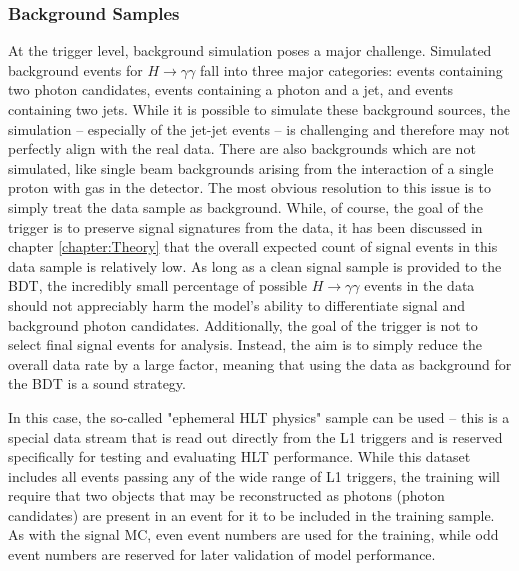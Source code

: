 \documentclass[12pt]{ucsddissertation}
\begin{document}
\subsubsection{Background Samples}\label{sec:HLTDataSamples}
At the trigger level, background simulation poses a major challenge. Simulated background events for $H \rightarrow \gamma\gamma$ fall into three major categories: events containing two photon candidates, events containing a photon and a jet, and events containing two jets. While it is possible to simulate these background sources, the simulation -- especially of the jet-jet events -- is challenging and therefore may not perfectly align with the real data. There are also backgrounds which are not simulated, like single beam backgrounds arising from the interaction of a single proton with gas in the detector. The most obvious resolution to this issue is to simply treat the data sample as background. While, of course, the goal of the trigger is to preserve signal signatures from the data, it has been discussed in chapter \ref{chapter:Theory} that the overall expected count of signal events in this data sample is relatively low. As long as a clean signal sample is provided to the BDT, the incredibly small percentage of possible $H \rightarrow \gamma\gamma$ events in the data should not appreciably harm the model's ability to differentiate signal and background photon candidates. Additionally, the goal of the trigger is not to select final signal events for analysis. Instead, the aim is to simply reduce the overall data rate by a large factor, meaning that using the data as background for the BDT is a sound strategy. 

In this case, the so-called "ephemeral HLT physics" sample can be used -- this is a special data stream that is read out directly from the L1 triggers and is reserved specifically for testing and evaluating HLT performance. While this dataset includes all events passing any of the wide range of L1 triggers, the training will require that two objects that may be reconstructed as photons (photon candidates) are present in an event for it to be included in the training sample. As with the signal MC, even event numbers are used for the training, while odd event numbers are reserved for later validation of model performance.
\end{document}
